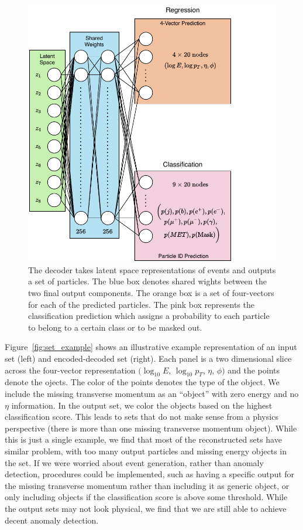 \documentclass[submission, Phys]{SciPost}
\begin{document}
\begin{figure}[t]
    \begin{center}
    \includegraphics[width=0.6\linewidth]{figures/Decoder.pdf}
    \caption{The decoder takes latent space representations of events and outputs a set of particles.
    The blue box denotes shared wights between the two final output components.
    The orange box is a set of four-vectors for each of the predicted particles.
    The pink box represents the classification prediction which assigns a probability to each particle to belong to a certain class or to be masked out.
    }
    \label{fig:Decoder}
\end{center}
\end{figure}

Figure~\ref{fig:set_example} shows an illustrative example representation of an input set (left) and encoded-decoded set (right).
Each panel is a two dimensional slice across the four-vector representation  $(\log_{10} E$, $\log_{10} p_T$, $\eta$, $\phi)$ and the points denote the ojects.
The color of the points denotes the type of the object.
We include the missing transverse momentum as an ``object'' with zero energy and no $\eta$ information.
In the output set, we color the objects based on the highest classification score.
This leads to sets that do not make sense from a physics perspective (there is more than one missing transverse momentum object).
While this is just a single example, we find that most of the reconstructed sets have similar problem, with too many output particles and missing energy objects in the set.
If we were worried about event generation, rather than anomaly detection, procedures could be implemented, such as having a specific output for the missing transverse momentum rather than including it as generic object, or only including objects if the classification score is above some threshold.
While the output sets may not look physical, we find that we are still able to achieve decent anomaly detection.
\end{document}

